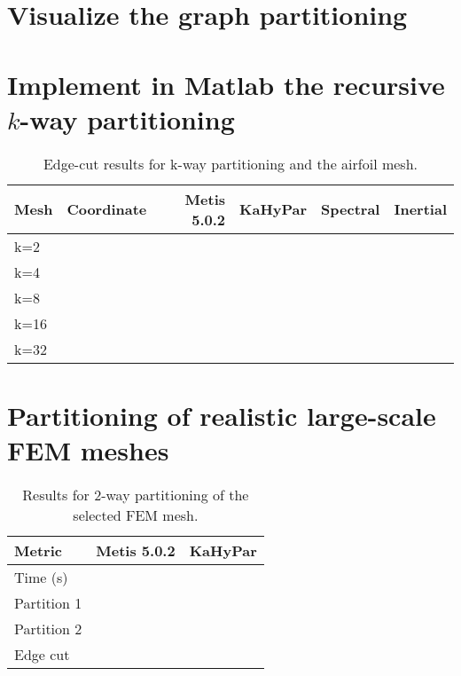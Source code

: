 \documentclass[unicode,11pt,a4paper,oneside,numbers=endperiod,openany]{scrartcl}
\begin{document}
\section{Visualize the graph partitioning }
\section{Implement in Matlab the recursive $k$-way partitioning }
\begin{table}[h]
	\caption{Edge-cut results for k-way partitioning and the airfoil mesh.}
	\centering
	\begin{tabular}{l|r|r|r|r|r} \hline\hline 
		Mesh            &  Coordinate           & Metis 5.0.2 & KaHyPar & Spectral & Inertial  \\ \hline
		k=2             &                       &           &           &          &           \\             
		k=4             &                       &           &           &          &           \\ 
		k=8             &                       &           &           &          &           \\ 
		k=16            &                       &           &           &          &           \\ 
		k=32            &                       &           &           &          &           \\ \hline \hline
	\end{tabular}
	\label{table:kway}
\end{table}
\section{Partitioning of realistic large-scale FEM meshes }
\begin{table}[h]
	\caption{Results for 2-way partitioning of the selected FEM mesh.}
	\centering
	\begin{tabular}{l|r|r} \hline\hline 
		Metric            &  Metis 5.0.2      & KaHyPar  \\ \hline
		Time (s)         &                       &                \\             
		Partition 1         &                       &          \\  
		Partition 2         &                       &         \\  
		Edge cut            &                       &       \\ \hline \hline
	\end{tabular}
	\label{table:FEMkway}
\end{table}
\end{document}
